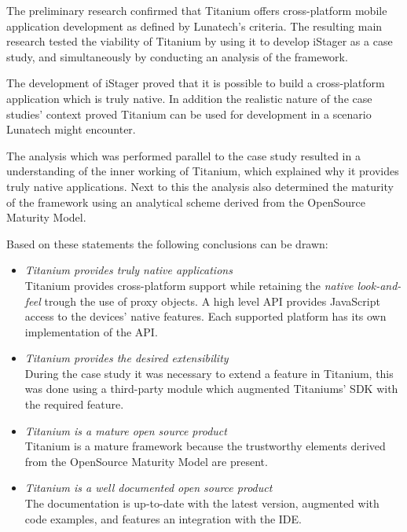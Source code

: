 
The preliminary research confirmed that Titanium offers cross-platform mobile application development as defined by Lunatech's criteria. The resulting main research tested the viability of Titanium by using it to develop iStager as a case study, and simultaneously by conducting an analysis of the framework.

The development of iStager proved that it is possible to build a cross-platform application which is truly native. In addition the realistic nature of the case studies' context proved Titanium can be used for development in a scenario Lunatech might encounter.

The analysis which was performed parallel to the case study resulted in a understanding of the inner working of Titanium, which explained why it provides truly native applications. Next to this the analysis also determined the maturity of the framework using an analytical scheme derived from the OpenSource Maturity Model. 

Based on these statements the following conclusions can be drawn:
\begin{itemize}
\item \emph{Titanium provides truly native applications}\\
Titanium provides cross-platform support while retaining the \emph{native look-and-feel} trough the use of proxy objects.  A high level API provides JavaScript access to the devices' native features. Each supported platform has its own implementation of the API.

\item \emph{Titanium provides the desired extensibility}\\
During the case study it was necessary to extend a feature in Titanium, this was done using a third-party module which augmented Titaniums' SDK with the required feature.

\item \emph{Titanium is a mature open source product}\\
Titanium is a mature framework because the trustworthy elements derived from the OpenSource Maturity Model are present.

\item \emph{Titanium is a well documented open source product}\\
The documentation is up-to-date with the latest version, augmented with code examples, and features an integration with the IDE.

\end{itemize}

